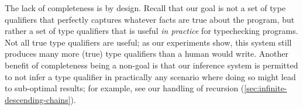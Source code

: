 The lack of completeness is by design. Recall that our goal is not a
set of type qualifiers that perfectly captures whatever facts are true
about the program, but rather a set of type qualifiers that is useful
\emph{in practice} for typechecking programs. Not all true type qualifiers
are useful; as our experiments show, this system still produces many more
(true) type qualifiers than a human would write.  Another benefit of completeness being a non-goal
is that our inference system is permitted to not infer a type qualifier
in practically any scenario where doing so might lead to sub-optimal results;
for example, see our handling of recursion (\cref{sec:infinite-descending-chains}).

